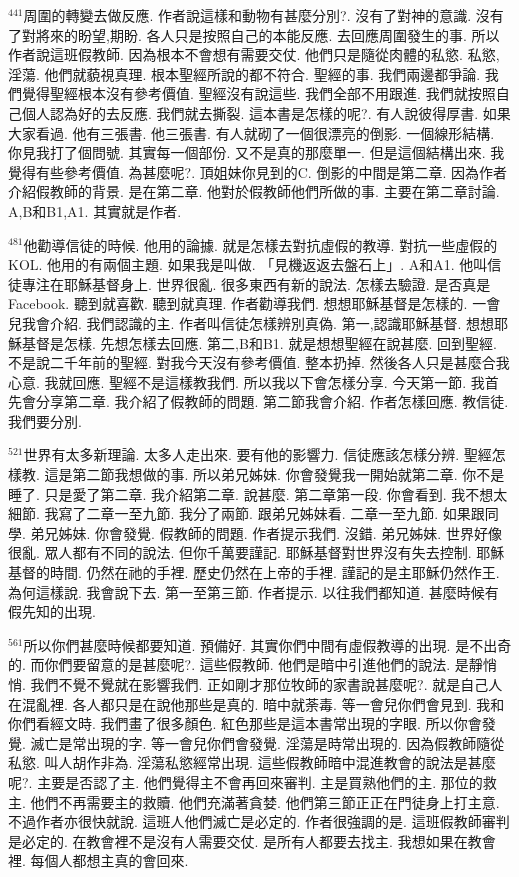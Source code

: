 \documentclass{book}
\begin{document}
$^{441}$周圍的轉變去做反應.
作者說這樣和動物有甚麼分別?.
沒有了對神的意識.
沒有了對將來的盼望,期盼.
各人只是按照自己的本能反應.
去回應周圍發生的事.
所以作者說這班假教師.
因為根本不會想有需要交仗.
他們只是隨從肉體的私慾.
私慾,淫蕩.
他們就藐視真理.
根本聖經所說的都不符合.
聖經的事.
我們兩邊都爭論.
我們覺得聖經根本沒有參考價值.
聖經沒有說這些.
我們全部不用跟進.
我們就按照自己個人認為好的去反應.
我們就去撕裂.
這本書是怎樣的呢?.
有人說彼得厚書.
如果大家看過.
他有三張書.
他三張書.
有人就砌了一個很漂亮的倒影.
一個線形結構.
你見我打了個問號.
其實每一個部份.
又不是真的那麼單一.
但是這個結構出來.
我覺得有些參考價值.
為甚麼呢?.
頂姐妹你見到的C.
倒影的中間是第二章.
因為作者介紹假教師的背景.
是在第二章.
他對於假教師他們所做的事.
主要在第二章討論.
A,B和B1,A1.
其實就是作者.

$^{481}$他勸導信徒的時候.
他用的論據.
就是怎樣去對抗虛假的教導.
對抗一些虛假的KOL.
他用的有兩個主題.
如果我是叫做.
「見機返返去盤石上」.
A和A1.
他叫信徒專注在耶穌基督身上.
世界很亂.
很多東西有新的說法.
怎樣去驗證.
是否真是Facebook.
聽到就喜歡.
聽到就真理.
作者勸導我們.
想想耶穌基督是怎樣的.
一會兒我會介紹.
我們認識的主.
作者叫信徒怎樣辨別真偽.
第一,認識耶穌基督.
想想耶穌基督是怎樣.
先想怎樣去回應.
第二,B和B1.
就是想想聖經在說甚麼.
回到聖經.
不是說二千年前的聖經.
對我今天沒有參考價值.
整本扔掉.
然後各人只是甚麼合我心意.
我就回應.
聖經不是這樣教我們.
所以我以下會怎樣分享.
今天第一節.
我首先會分享第二章.
我介紹了假教師的問題.
第二節我會介紹.
作者怎樣回應.
教信徒.
我們要分別.

$^{521}$世界有太多新理論.
太多人走出來.
要有他的影響力.
信徒應該怎樣分辨.
聖經怎樣教.
這是第二節我想做的事.
所以弟兄姊妹.
你會發覺我一開始就第二章.
你不是睡了.
只是愛了第二章.
我介紹第二章.
說甚麼.
第二章第一段.
你會看到.
我不想太細節.
我寫了二章一至九節.
我分了兩節.
跟弟兄姊妹看.
二章一至九節.
如果跟同學.
弟兄姊妹.
你會發覺.
假教師的問題.
作者提示我們.
沒錯.
弟兄姊妹.
世界好像很亂.
眾人都有不同的說法.
但你千萬要謹記.
耶穌基督對世界沒有失去控制.
耶穌基督的時間.
仍然在祂的手裡.
歷史仍然在上帝的手裡.
謹記的是主耶穌仍然作王.
為何這樣說.
我會說下去.
第一至第三節.
作者提示.
以往我們都知道.
甚麼時候有假先知的出現.

$^{561}$所以你們甚麼時候都要知道.
預備好.
其實你們中間有虛假教導的出現.
是不出奇的.
而你們要留意的是甚麼呢?.
這些假教師.
他們是暗中引進他們的說法.
是靜悄悄.
我們不覺不覺就在影響我們.
正如剛才那位牧師的家書說甚麼呢?.
就是自己人在混亂裡.
各人都只是在說他那些是真的.
暗中就荼毒.
等一會兒你們會見到.
我和你們看經文時.
我們畫了很多顏色.
紅色那些是這本書常出現的字眼.
所以你會發覺.
滅亡是常出現的字.
等一會兒你們會發覺.
淫蕩是時常出現的.
因為假教師隨從私慾.
叫人胡作非為.
淫蕩私慾經常出現.
這些假教師暗中混進教會的說法是甚麼呢?.
主要是否認了主.
他們覺得主不會再回來審判.
主是買熟他們的主.
那位的救主.
他們不再需要主的救贖.
他們充滿著貪婪.
他們第三節正正在門徒身上打主意.
不過作者亦很快就說.
這班人他們滅亡是必定的.
作者很強調的是.
這班假教師審判是必定的.
在教會裡不是沒有人需要交仗.
是所有人都要去找主.
我想如果在教會裡.
每個人都想主真的會回來.
\end{document}
